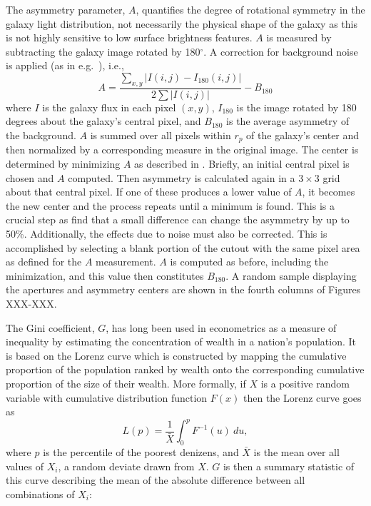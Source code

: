 The asymmetry parameter, $A$, quantifies the degree of rotational symmetry in the galaxy light distribution, not necessarily the physical shape of the galaxy as this is not highly sensitive to low surface brightness features. $A$ is measured by subtracting the galaxy image rotated by 180$^{\circ}$. A correction for background noise is applied (as in e.g.~\cite{Conselice2000, Lotz2004}), i.e., 
\begin{equation}
A = \frac{\sum_{x,y} |I(i,j) - I_{180}(i,j)|}{ 2\sum|I(i,j)|} - B_{180}
\end{equation}
where $I$ is the galaxy flux in each pixel $(x, y)$, $I_{180}$ is the image rotated by 180 degrees about the galaxy's central pixel, and $B_{180}$ is the average asymmetry of the background. $A$ is summed over all pixels within $r_p$ of the galaxy's center and then normalized by a corresponding measure in the original image. The center is determined by minimizing $A$ as described in \cite{Conselice2000}. Briefly, an initial central pixel is chosen and $A$ computed. Then asymmetry is calculated again in a $3\times3$ grid about that central pixel. If one of these produces a lower value of $A$, it becomes the new center and the process repeats until a minimum is found. This is a crucial step as \cite{Conselice2000} find that a small difference can change the asymmetry by up to 50\%. Additionally, the effects due to noise must also be corrected. This is accomplished by selecting a blank portion of the cutout with the same pixel area as defined for the $A$ measurement.  $A$ is computed as before, including the minimization, and this value then constitutes $B_{180}$. A random sample displaying the apertures and asymmetry centers are shown in the fourth columns of Figures XXX-XXX. 

The Gini coefficient, $G$, has long been used in econometrics as a measure of inequality by estimating the concentration of wealth in a nation's population. It is based on the Lorenz curve \citep{Lorenz1905} which is constructed by mapping the cumulative proportion of the population ranked by wealth onto the corresponding cumulative proportion of the size of their wealth. More formally, if $X$ is a positive random variable with cumulative distribution function $F(x)$ then the Lorenz curve goes as   
\begin{equation}
L(p) = \frac{1}{\bar X}\int^p_0 F^{-1}(u)~du,
\end{equation}
where $p$ is the percentile of the poorest denizens, and $\bar X$ is the mean over all values of $X_i$, a random deviate drawn from $X$. $G$ is then a summary statistic of this curve describing the mean of the absolute difference between all combinations of $X_i$:

